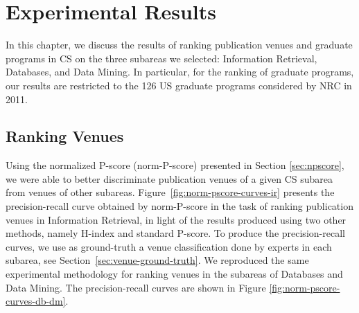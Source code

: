 \documentclass[msc]{ppgccufmg}
\begin{document}
\chapter{Experimental Results}\label{sec:results}

In this chapter, we discuss the results of ranking publication venues and graduate programs in CS on the three subareas we selected: Information Retrieval, Databases, and Data Mining. In particular, for the ranking of graduate programs, our results are restricted to the 126 US graduate programs considered by NRC in 2011.


\section{Ranking Venues}\label{sec:results-venues}

Using the normalized P-score (norm-P-score) presented in Section \ref{sec:npscore}, we were able to better discriminate publication venues of a given CS subarea from venues of other subareas. Figure~\ref{fig:norm-pscore-curves-ir} presents the precision-recall curve obtained by norm-P-score in the task of ranking publication venues in Information Retrieval, in light of the results produced using two other methods, namely H-index and standard P-score.
%
To produce the precision-recall curves, we use as ground-truth a venue classification done by experts in each subarea, see Section~\ref{sec:venue-ground-truth}. We reproduced the same experimental methodology for ranking venues in the subareas of Databases and Data Mining. The precision-recall curves are shown in Figure \ref{fig:norm-pscore-curves-db-dm}.
\end{document}
